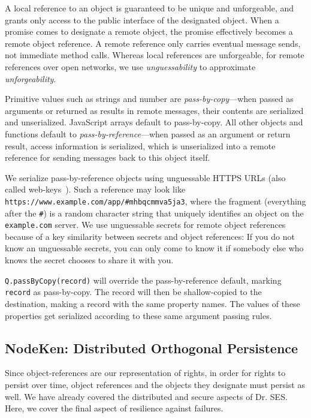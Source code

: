 \documentclass{llncs}
\begin{document}
A local reference to an object is guaranteed to be unique and unforgeable, and grants only access to the public interface of the designated object. When a promise comes to designate a remote object, the promise effectively becomes a remote object reference. A remote reference only carries eventual message sends, not immediate method calls. Whereas local references are unforgeable, for remote references over open networks, we use \emph{unguessability} to approximate \emph{unforgeability}.

Primitive values such as strings and number are \emph{pass-by-copy}---when passed as arguments or returned as results in remote messages, their contents are serialized and unserialized. JavaScript arrays default to pass-by-copy. All other objects and functions default to \emph{pass-by-reference}---when passed as an argument or return result, access information is serialized, which is unserialized into a remote reference for sending messages back to this object itself.

We serialize pass-by-reference objects using unguessable HTTPS URLs (also called web-keys~\cite{Close:Webkeys}). Such a reference may look like {\tt https://www.example.com/app/\#mhbqcmmva5ja3}, where the fragment (everything after the {\tt \#}) is a random character string that uniquely identifies an object on the {\tt example.com} server. We use unguessable secrets for remote object references because of a key similarity between secrets and object references: If you do not know an unguessable secrets, you can only come to know it if somebody else who knows the secret chooses to share it with you.

\begin{description*}
\item[{\tt Q.passByCopy(record)}] will override the pass-by-reference default, marking {\tt record} as pass-by-copy. The record will then be shallow-copied to the destination, making a record with the same property names. The values of these properties get serialized according to these same argument passing rules.
\end{description*}


\subsection{NodeKen: Distributed Orthogonal Persistence}
\label{NodeKen}

Since object-references are our representation of rights, in order for rights to persist over time, object references and the objects they designate must persist as well. We have already covered the distributed and secure aspects of Dr. SES. Here, we cover the final aspect of resilience against failures.
\end{document}
